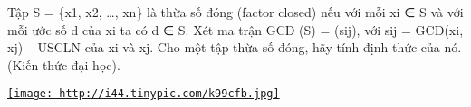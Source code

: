 Tập S = \{x1, x2, …, xn\} là thừa số đóng (factor closed) nếu với mỗi xi ∈ S  và với mỗi ước số d của  xi ta có d ∈ S. Xét ma trận GCD  (S) = (sij), với sij = GCD(xi, xj) – USCLN của xi và xj.  Cho một tập thừa số đóng, hãy tính định thức của nó. (Kiến thức đại học).  

\href{http://tinypic.com}{
\texttt{[image: http://i44.tinypic.com/k99cfb.jpg]}}